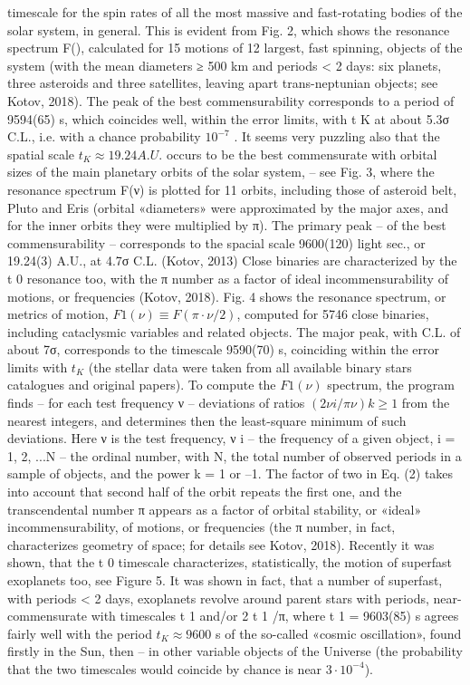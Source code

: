 timescale for the spin rates of all the most massive and fast-rotating bodies of the solar system, in
general.
This is evident from Fig. 2, which shows the resonance spectrum F(\nu), calculated for 15
motions of 12 largest, fast spinning, objects of the system (with the mean diameters ≥ 500 km and
periods < 2 days: six planets, three asteroids and three satellites, leaving apart trans-neptunian
objects; see Kotov, 2018). The peak of the best commensurability corresponds to a period of
9594(65) s, which coincides well, within the error limits, with t K at about 5.3σ C.L., i.e. with a
chance probability $10^{-7}$ .
It seems very puzzling also that the spatial scale $t_K ≈ 19.24 A.U.$ occurs to be the best
commensurate with orbital sizes of the main planetary orbits of the solar system, – see Fig. 3,
where the resonance spectrum F(ν) is plotted for 11 orbits, including those of asteroid belt, Pluto
and Eris (orbital «diameters» were approximated by the major axes, and for the inner orbits they
were multiplied by π). The primary peak – of the best commensurability – corresponds to the
spacial scale 9600(120) light sec., or 19.24(3) A.U., at 4.7σ C.L. (Kotov, 2013)
Close binaries are characterized by the t 0 resonance too, with the π number as a factor of ideal
incommensurability of motions, or frequencies (Kotov, 2018). Fig. 4 shows the resonance spectrum,
or metrics of motion, $F 1 (\nu) ≡ F(\pi \cdot \nu/2)$, computed for 5746 close binaries, including cataclysmic
variables and related objects. The major peak, with C.L. of about 7σ, corresponds to the timescale
9590(70) s, coinciding within the error limits with $t_K$ (the stellar data were taken from all available
binary stars catalogues and original papers).
To compute the $F 1 (\nu)$ spectrum, the program finds – for each test frequency ν – deviations of
ratios $(2\nu i /\pi \nu) k ≥ 1$ from the nearest integers, and determines then the least-square minimum of such
deviations. Here ν is the test frequency, ν i – the frequency of a given object, i = 1, 2, ...N – the
ordinal number, with N, the total number of observed periods in a sample of objects, and the power
k = 1 or –1. The factor of two in Eq. (2) takes into account that second half of the orbit repeats the
first one, and the transcendental number π appears as a factor of orbital stability, or «ideal»
incommensurability, of motions, or frequencies (the π number, in fact, characterizes geometry of
space; for details see Kotov, 2018).
Recently it was shown, that the t 0 timescale characterizes, statistically, the motion of superfast
exoplanets too, see Figure 5.
It was shown in fact, that a number of superfast, with periods < 2 days, exoplanets revolve
around parent stars with periods, near-commensurate with timescales t 1 and/or 2 t 1 /π, where t 1 =
9603(85) s agrees fairly well with the period $t_K ≈ 9600$ s of the so-called «cosmic oscillation», found
firstly in the Sun, then – in other variable objects of the Universe (the probability that the two
timescales would coincide by chance is near $3 \cdot 10^{-4}$).

